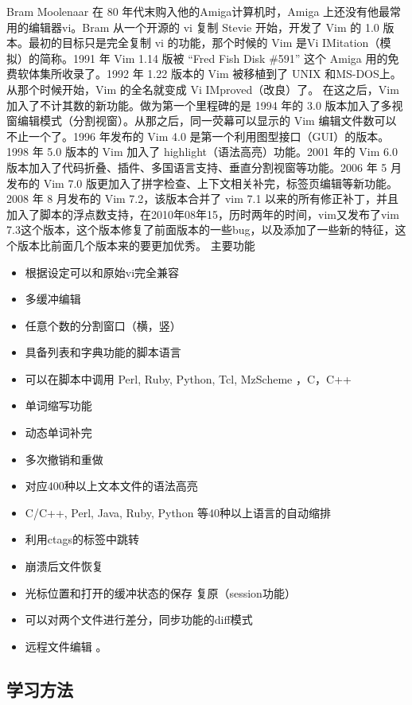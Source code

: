 \documentclass[11pt]{article}
\begin{document}
    Bram Moolenaar 在 80 年代末购入他的Amiga计算机时，Amiga 上还没有他最常用的编辑器vi。Bram 从一个开源的 vi 复制 Stevie 开始，开发了 Vim 的 1.0 版本。最初的目标只是完全复制 vi 的功能，那个时候的 Vim 是Vi IMitation（模拟）的简称。1991 年 Vim 1.14 版被 ``Fred Fish Disk \#591'' 这个 Amiga 用的免费软体集所收录了。1992 年 1.22 版本的 Vim 被移植到了 UNIX 和MS-DOS上。从那个时候开始，Vim 的全名就变成 Vi IMproved（改良）了。
    在这之后，Vim 加入了不计其数的新功能。做为第一个里程碑的是 1994 年的 3.0 版本加入了多视窗编辑模式（分割视窗）。从那之后，同一荧幕可以显示的 Vim 编辑文件数可以不止一个了。1996 年发布的 Vim 4.0 是第一个利用图型接口（GUI）的版本。1998 年 5.0 版本的 Vim 加入了 highlight（语法高亮）功能。2001 年的 Vim 6.0 版本加入了代码折叠、插件、多国语言支持、垂直分割视窗等功能。2006 年 5 月发布的 Vim 7.0 版更加入了拼字检查、上下文相关补完，标签页编辑等新功能。 2008 年 8 月发布的 Vim 7.2，该版本合并了 vim 7.1 以来的所有修正补丁，并且加入了脚本的浮点数支持，在2010年08年15，历时两年的时间，vim又发布了vim 7.3这个版本，这个版本修复了前面版本的一些bug，以及添加了一些新的特征，这个版本比前面几个版本来的要更加优秀。
    主要功能
\begin{itemize}
\item 根据设定可以和原始vi完全兼容
\item 多缓冲编辑
\item 任意个数的分割窗口（横，竖）
\item 具备列表和字典功能的脚本语言
\item 可以在脚本中调用 Perl, Ruby, Python, Tcl, MzScheme ，C，C++
\item 单词缩写功能
\item 动态单词补完
\item 多次撤销和重做
\item 对应400种以上文本文件的语法高亮
\item C/C++, Perl, Java, Ruby, Python 等40种以上语言的自动缩排
\item 利用ctags的标签中跳转
\item 崩溃后文件恢复
\item 光标位置和打开的缓冲状态的保存 复原（session功能）
\item 可以对两个文件进行差分，同步功能的diff模式
\item 远程文件编辑 。
\end{itemize}
\subsection{学习方法}
\label{sec-12-4}
\end{document}

